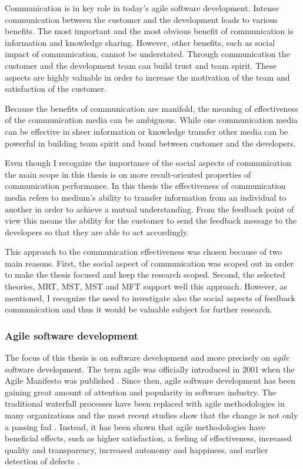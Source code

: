 \documentclass[english,12pt,a4paper,pdftex]{article}
\begin{document}
Communication is in key role in today's agile software development. Intense communication between the customer and the development leads to various benefits. The most important and the most obvious benefit of communication is information and knowledge sharing. However, other benefits, such as social impact of communication, cannot be understated. Through communication the customer and the development team can build trust and team spirit. These aspects are highly valuable in order to increase the motivation of the team and satisfaction of the customer.

Because the benefits of communication are manifold, the meaning of effectiveness of the communication media can be ambiguous. While one communication media can be effective in sheer information or knowledge transfer other media can be powerful in building team spirit and bond between customer and the developers.

Even though I recognize the importance of the social aspects of communication the main scope in this thesis is on more result-oriented properties of communication performance. In this thesis the effectiveness of communication media refers to medium's ability to transfer information from an individual to another in order to achieve a mutual understanding. From the feedback point of view this means the ability for the customer to send the feedback message to the developers so that they are able to act accordingly.

This approach to the communication effectiveness was chosen because of two main reasons. First, the social aspect of communication was scoped out in order to make the thesis focused and keep the research scoped. Second, the selected theories, \ac{MRT}, \ac{MST}, \ac{MST} and \ac{MFT} support well this approach. However, as mentioned, I recognize the need to investigate also the social aspects of feedback communication and thus it would be valuable subject for further research.

\subsubsection{Agile software development}

The focus of this thesis is on software development and more precisely on \emph{agile} software development. The term agile was officially introduced in 2001 when the Agile Manifesto was published \citep{agilemanifesto}. Since then, agile software development has been gaining great amount of attention and popularity in software industry. The traditional waterfall processes have been replaced with agile methodologies in many organizations and the most recent studies show that the change is not only a passing fad \citep{laanti2011}. Instead, it has been shown that agile methodologies have beneficial effects, such as higher satisfaction, a feeling of effectiveness, increased quality and transparency, increased autonomy and happiness, and earlier detection of defects \citep{korhonen2012}.
\end{document}
